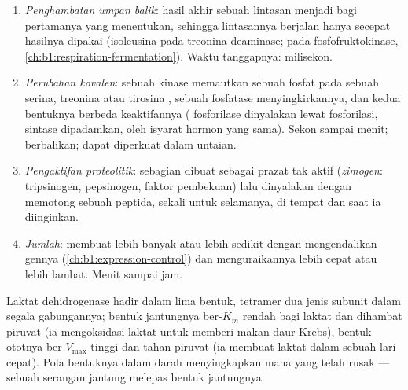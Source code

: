 \begin{proposition}\label{prop:b1:enzymes:control}
\begin{enumerate}
  \item \emph{Penghambatan umpan balik}:
        hasil akhir sebuah lintasan menjadi   bagi
         pertamanya yang menentukan, sehingga lintasannya berjalan
        hanya secepat hasilnya dipakai (isoleusina pada treonina
        deaminase;  pada fosfofruktokinase,
        \cref{ch:b1:respiration-fermentation}). Waktu tanggapnya:
        milisekon.
  \item \emph{Perubahan kovalen}: sebuah
        kinase memautkan sebuah fosfat pada sebuah serina, treonina
        atau tirosina , sebuah fosfatase menyingkirkannya, dan
        kedua bentuknya berbeda keaktifannya ( fosforilase
        dinyalakan lewat fosforilasi,  sintase dipadamkan, oleh
        isyarat hormon yang sama). Sekon sampai menit; berbalikan; dapat
        diperkuat dalam untaian.
  \item \emph{Pengaktifan proteolitik}: sebagian  dibuat sebagai
        prazat tak aktif (\emph{zimogen}: tripsinogen, pepsinogen,
        faktor pembekuan) lalu dinyalakan dengan memotong sebuah
        peptida, sekali untuk selamanya, di tempat dan saat ia
        diinginkan.
  \item \emph{Jumlah}:  membuat  lebih banyak atau lebih
        sedikit dengan mengendalikan gennya
        (\cref{ch:b1:expression-control}) dan menguraikannya lebih cepat
        atau lebih lambat. Menit sampai jam.
\end{enumerate}
\end{proposition}

\begin{example}[Isoenzim]\label{ex:b1:enzymes:isoenzymes}
Laktat dehidrogenase hadir dalam lima bentuk, tetramer dua jenis subunit
dalam segala gabungannya; bentuk jantungnya ber-$K_m$ rendah bagi
laktat dan dihambat piruvat (ia mengoksidasi laktat untuk memberi makan
daur Krebs), bentuk ototnya ber-$V_{\max}$ tinggi dan tahan piruvat (ia
membuat laktat dalam sebuah lari cepat). Pola bentuknya dalam darah
menyingkapkan  mana yang telah rusak --- sebuah serangan jantung
melepas bentuk jantungnya.
\end{example}

